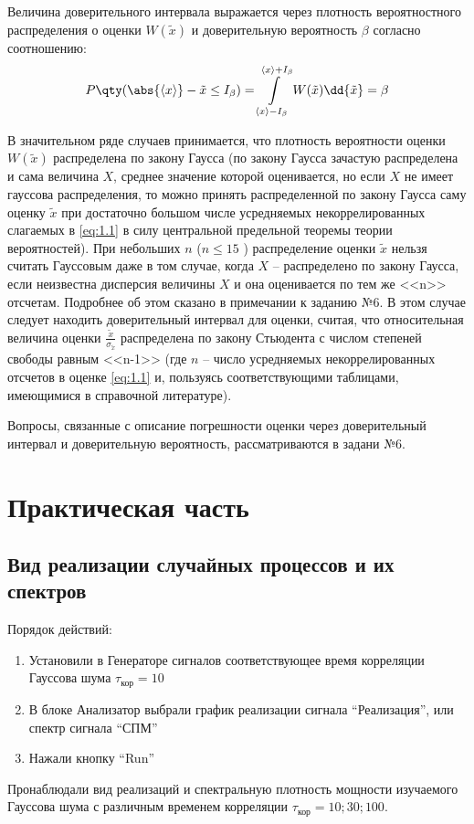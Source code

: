 Величина доверительного интервала выражается через плотность вероятностного распределения о
оценки $W(\tilde x)$ и доверительную вероятность $\beta$ согласно соотношению:
\begin{equation}
    \label{eq:5.1}
    P\qty(\abs{\mean{x}} - \tilde x \leq I_{\beta}) = \int\limits_{\mean{x}-I_{\beta}}^{\mean{x}+I_{\beta}}  W(\tilde x) \dd{\tilde x} = \beta
\end{equation}

В значительном ряде случаев принимается, что плотность вероятности оценки  $W(\tilde x)$ распределена по закону Гаусса (по закону Гаусса зачастую распределена и сама величина $X$,
среднее значение которой оценивается, но если $X$ не имеет гауссова распределения, то 
можно принять распределенной по закону Гаусса саму оценку $\tilde x$  при достаточно большом числе 
усредняемых некоррелированных слагаемых в \eqref{eq:1.1}  в силу центральной предельной теоремы теории вероятностей).
При небольших $n$ ($n\leq 15$ ) распределение оценки $\tilde x$ нельзя считать 
Гауссовым даже в том случае, когда $X$ -- распределено по закону Гаусса, если 
неизвестна дисперсия величины $X$ и она оценивается по тем же <<n>> отсчетам. 
Подробнее об этом сказано в примечании к заданию №6. 
В этом случае следует находить доверительный интервал для оценки, считая, что относительная величина оценки $\frac{\tilde x}{\sigma_{\tilde x}}$ распределена по
закону Стьюдента с числом степеней свободы равным <<n-1>> (где $n$ -- число 
усредняемых некоррелированных отсчетов в оценке \eqref{eq:1.1}  и, пользуясь соответствующими таблицами, имеющимися в справочной литературе).

Вопросы, связанные с описание погрешности оценки через доверительный интервал и доверительную вероятность, рассматриваются в задани  №6.

\section{Практическая часть}
\subsection[Задание 1]{Вид реализации случайных процессов и их спектров}

Порядок действий:
\begin{enumerate}
	\item Установили в Генераторе сигналов соответствующее время корреляции Гауссова шума $\tau_\text{кор} = 10$
	\item В блоке Анализатор выбрали график реализации сигнала “Реализация”, или спектр сигнала “СПМ”
	\item Нажали кнопку “Run”
\end{enumerate}
Пронаблюдали вид реализаций и спектральную плотность мощности изучаемого Гауссова шума с различным временем корреляции $\tau_\text{кор} =10; 30; 100$.

